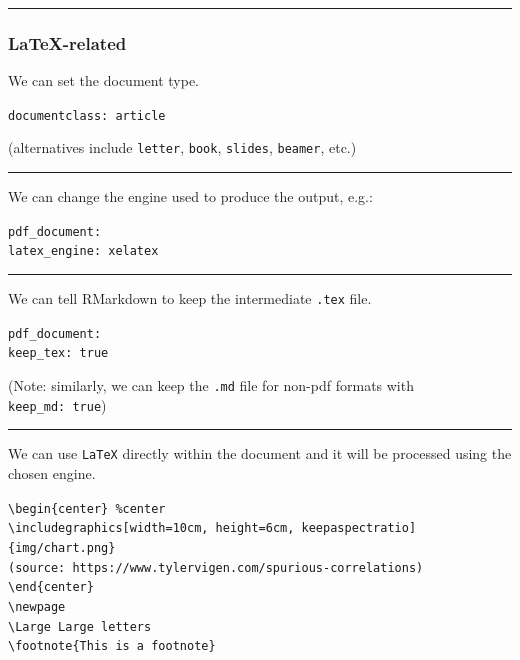 \documentclass[
  11pt,
]{article}
\begin{document}
\begin{center}\rule{0.5\linewidth}{0.5pt}\end{center}

\hypertarget{latex-related}{%
\subsubsection{LaTeX-related}\label{latex-related}}

We can set the document type.

\texttt{documentclass:\ article}

(alternatives include \texttt{letter}, \texttt{book}, \texttt{slides},
\texttt{beamer}, etc.)

\begin{center}\rule{0.5\linewidth}{0.5pt}\end{center}

We can change the engine used to produce the output, e.g.:

\texttt{pdf\_document:}~\\
\texttt{latex\_engine:\ xelatex}

\begin{center}\rule{0.5\linewidth}{0.5pt}\end{center}

We can tell RMarkdown to keep the intermediate \texttt{.tex} file.

\texttt{pdf\_document:}~\\
\texttt{keep\_tex:\ true}

(Note: similarly, we can keep the \texttt{.md} file for non-pdf formats
with \texttt{keep\_md:\ true})

\begin{center}\rule{0.5\linewidth}{0.5pt}\end{center}

We can use \texttt{LaTeX} directly within the document and it will be
processed using the chosen engine.

\texttt{\textbackslash{}begin\{center\}\ \%center}~\\
\texttt{\textbackslash{}includegraphics{[}width=10cm,\ height=6cm,\ keepaspectratio{]}\{img/chart.png\}}~\\
\texttt{(source:\ https://www.tylervigen.com/spurious-correlations)}~\\
\texttt{\textbackslash{}end\{center\}}~\\
\texttt{\textbackslash{}newpage}~\\
\texttt{\textbackslash{}Large\ Large\ letters}~\\
\texttt{\textbackslash{}footnote\{This\ is\ a\ footnote\}}
\end{document}
